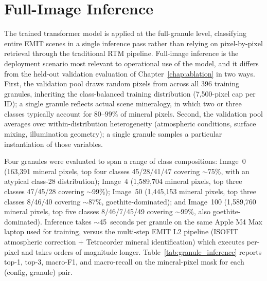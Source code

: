 \documentclass[11pt]{report}
\begin{document}
\section{Full-Image Inference}
\label{sec:full_image_inference}

The trained transformer model is applied at the full-granule level, classifying entire EMIT scenes in a single inference pass rather than relying on pixel-by-pixel retrieval through the traditional RTM pipeline. Full-image inference is the deployment scenario most relevant to operational use of the model, and it differs from the held-out validation evaluation of Chapter~\ref{chap:ablation} in two ways. First, the validation pool draws random pixels from across all 396 training granules, inheriting the class-balanced training distribution (7,500-pixel cap per ID); a single granule reflects actual scene mineralogy, in which two or three classes typically account for $80$--$99\%$ of mineral pixels. Second, the validation pool averages over within-distribution heterogeneity (atmospheric conditions, surface mixing, illumination geometry); a single granule samples a particular instantiation of those variables.

Four granules were evaluated to span a range of class compositions: Image~0 (163{,}391 mineral pixels, top four classes 45/28/41/47 covering $\sim$75\%, with an atypical class-28 distribution); Image~4 (1{,}589{,}704 mineral pixels, top three classes 47/45/28 covering $\sim$99\%); Image~50 (1{,}445{,}153 mineral pixels, top three classes 8/46/40 covering $\sim$87\%, goethite-dominated); and Image~100 (1{,}589{,}760 mineral pixels, top five classes 8/46/7/45/49 covering $\sim$99\%, also goethite-dominated). Inference takes $\sim$45~seconds per granule on the same Apple M4 Max laptop used for training, versus the multi-step EMIT L2 pipeline (ISOFIT atmospheric correction $+$ Tetracorder mineral identification) which executes per-pixel and takes orders of magnitude longer. Table~\ref{tab:granule_inference} reports top-1, top-3, macro-F1, and macro-recall on the mineral-pixel mask for each (config, granule) pair.
\end{document}
